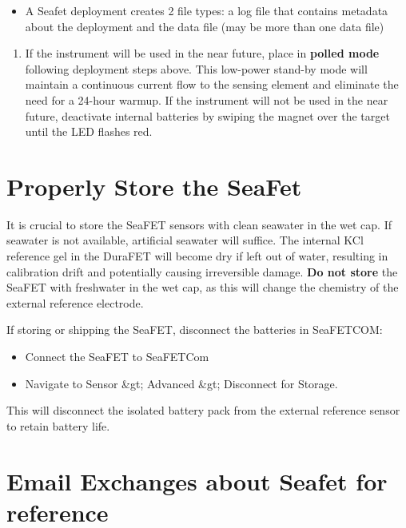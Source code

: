 \documentclass[
]{book}
\providecommand{\tightlist}{%
  \setlength{\itemsep}{0pt}\setlength{\parskip}{0pt}}
\begin{document}
\begin{itemize}
\tightlist
\item
  A Seafet deployment creates 2 file types: a log file that contains metadata about the deployment and the data file (may be more than one data file)
\end{itemize}

\begin{enumerate}
\def\labelenumi{\arabic{enumi}.}
\setcounter{enumi}{5}
\tightlist
\item
  If the instrument will be used in the near future, place in \textbf{polled mode} following deployment steps above. This low-power stand-by mode will maintain a continuous current flow to the sensing element and eliminate the need for a 24-hour warmup. If the instrument will not be used in the near future, deactivate internal batteries by swiping the magnet over the target until the LED flashes red.
\end{enumerate}

\hypertarget{properly-store-the-seafet}{%
\section{Properly Store the SeaFet}\label{properly-store-the-seafet}}

It is crucial to store the SeaFET sensors with clean seawater in the wet cap. If seawater is not available, artificial seawater will suffice. The internal KCl reference gel in the DuraFET will become dry if left out of water, resulting in calibration drift and potentially causing irreversible damage. \textbf{Do not store} the SeaFET with freshwater in the wet cap, as this will change the chemistry of the external reference electrode.

If storing or shipping the SeaFET, disconnect the batteries in SeaFETCOM:

\begin{itemize}
\tightlist
\item
  Connect the SeaFET to SeaFETCom
\item
  Navigate to Sensor \&gt; Advanced \&gt; Disconnect for Storage.
\end{itemize}

This will disconnect the isolated battery pack from the external reference sensor to retain battery life.

\hypertarget{email-exchanges-about-seafet-for-reference}{%
\section{Email Exchanges about Seafet for reference}\label{email-exchanges-about-seafet-for-reference}}
\end{document}
